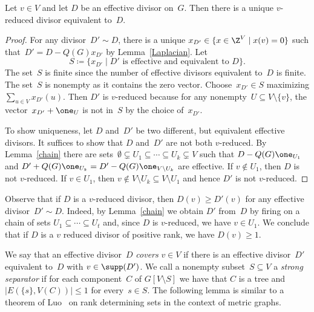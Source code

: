 \begin{lemma}\label{reduction}
Let $v\in V$ and let $D$ be an effective divisor on~$G$. Then there is a unique $v$-reduced divisor equivalent to~$D$.
\end{lemma}

\begin{proof}
For any divisor~$D' \sim D$, there is a unique $x_{D'}\in \{x\in \Z^V\mid x(v)=0\}$ such that~$D'=D-Q(G)x_{D'}$ by Lemma~\ref{Laplacian}. Let 
\begin{equation}
S\coloneqq \{x_{D'}\mid D'\text{ is effective and equivalent to~$D$}\}.
\end{equation}
The set~$S$ is finite since the number of effective divisors equivalent to~$D$ is finite. The set~$S$ is nonempty as it contains the zero vector. Choose~$x_{D'}\in S$ maximizing $\sum_{u\in V} x_{D'}(u)$. Then $D'$ is $v$-reduced because for any nonempty~$U\subseteq V\setminus \{v\}$, the vector~$x_{D'}+\one_U$ is not in~$S$ by the choice of~$x_{D'}$. 

To show uniqueness, let $D$ and~$D'$ be two different, but equivalent effective divisors. It suffices to show that $D$ and~$D'$ are not both $v$-reduced. By Lemma~\ref{chain} there are sets~$\emptyset\subsetneq U_1\subseteq\cdots\subseteq U_k\subsetneq V$ such that $D-Q(G)\one_{U_1}$ and $D'+Q(G)\one_{U_k}=D'-Q(G)\one_{V\setminus U_k}$ are effective. If $v\not\in U_1$, then $D$ is not $v$-reduced. If $v\in U_1$, then $v\not\in V\setminus U_k\subseteq V\setminus U_1$ and hence $D'$ is not $v$-reduced.
\end{proof}
\begin{rema}
Observe that if $D$ is a $v$-reduced divisor, then $D(v)\geq D'(v)$ for any effective divisor~$D'\sim D$. Indeed, by Lemma~\ref{chain} we obtain $D'$ from~$D$ by firing on a chain of sets $U_1\subseteq\cdots\subseteq U_t$ and, since $D$ is $v$-reduced, we have $v\in U_1$. We conclude that if $D$ is a $v$ reduced divisor of positive rank, we have $D(v)\geq 1$. 
\end{rema}

We say that an effective divisor~$D$ \emph{covers} $v\in V$ if there is an effective divisor~$D'$ equivalent to~$D$ with $v\in \supp(D')$. We call a nonempty subset~$S\subseteq V$ a \emph{strong separator} if for each component~$C$ of $G[V\setminus S]$ we have that $C$ is a tree and $|E(\{s\},V(C))|\leq 1$ for every~$s\in S$. The following lemma is similar to a theorem of Luo~\cite{Luo2011} on rank determining sets in the context of metric graphs.

